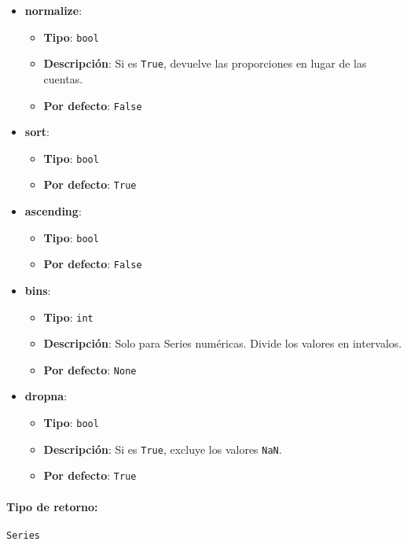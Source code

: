     \begin{itemize}
        \item \textbf{normalize}:
            \begin{itemize}
                \item \textbf{Tipo}: \texttt{bool}
                \item \textbf{Descripción}: Si es \texttt{True}, devuelve las proporciones en lugar de las cuentas.
                \item \textbf{Por defecto}: \texttt{False}
            \end{itemize}
        \item \textbf{sort}:
            \begin{itemize}
                \item \textbf{Tipo}: \texttt{bool}
                \item \textbf{Por defecto}: \texttt{True}
            \end{itemize}
        \item \textbf{ascending}:
            \begin{itemize}
                \item \textbf{Tipo}: \texttt{bool}
                \item \textbf{Por defecto}: \texttt{False}
            \end{itemize}
        \item \textbf{bins}:
            \begin{itemize}
                \item \textbf{Tipo}: \texttt{int}
                \item \textbf{Descripción}: Solo para Series numéricas. Divide los valores en intervalos.
                \item \textbf{Por defecto}: \texttt{None}
            \end{itemize}
        \item \textbf{dropna}:
            \begin{itemize}
                \item \textbf{Tipo}: \texttt{bool}
                \item \textbf{Descripción}: Si es \texttt{True}, excluye los valores \texttt{NaN}.
                \item \textbf{Por defecto}: \texttt{True}
            \end{itemize}
    \end{itemize}
    \paragraph{Tipo de retorno:} \texttt{Series}

